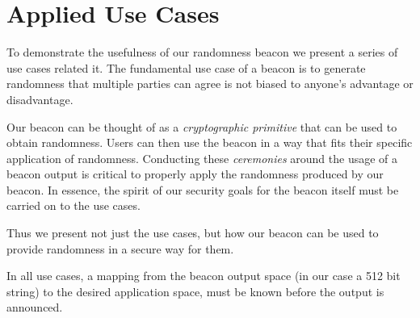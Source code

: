 \section{Applied Use Cases}
To demonstrate the usefulness of our randomness beacon we present a series of use cases related it.
The fundamental use case of a beacon is to generate randomness that multiple parties can agree is not biased to anyone's advantage or disadvantage.

Our beacon can be thought of as a \emph{cryptographic primitive} that can be used to obtain randomness. Users can then use the beacon in a way that fits their specific application of randomness. Conducting these \emph{ceremonies} around the usage of a beacon output is critical to properly apply the randomness produced by our beacon. In essence, the spirit of our security goals for the beacon itself must be carried on to the use cases.

Thus we present not just the use cases, but how our beacon can be used to provide randomness in a secure way for them.

In all use cases, a mapping from the beacon output space (in our case a 512 bit string) to the desired application space, must be known before the output is announced.